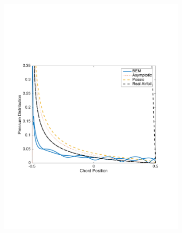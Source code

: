 \documentclass{article}
\begin{document}
\begin{figure}[h]
\centering
\begin{subfigure}{0.3\textwidth}
	\centering
	\includegraphics[width = \textwidth, height=0.16\textheight]{NACA0003_pressure_k15mag}
\end{subfigure}%
\begin{subfigure}{0.3\textwidth}
	\centering

\end{subfigure}
\end{figure}
\end{document}
